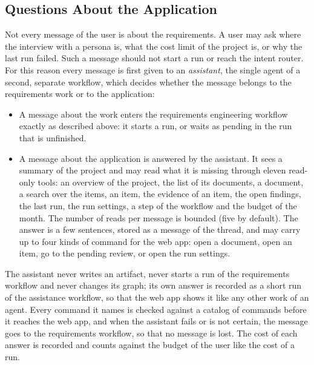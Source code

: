 \subsection{Questions About the Application}
\label{sec:pa-assistance}
Not every message of the user is about the requirements. A user may ask where the interview with a persona is, what the cost limit of the project is, or why the last run failed. Such a message should not start a run or reach the intent router. For this reason every message is first given to an \emph{assistant}, the single agent of a second, separate workflow, which decides whether the message belongs to the requirements work or to the application:
\begin{itemize}
    \item A message about the work enters the requirements engineering workflow exactly as described above: it starts a run, or waits as pending in the run that is unfinished.
    \item A message about the application is answered by the assistant. It sees a summary of the project and may read what it is missing through eleven read-only tools: an overview of the project, the list of its documents, a document, a search over the items, an item, the evidence of an item, the open findings, the last run, the run settings, a step of the workflow and the budget of the month. The number of reads per message is bounded (five by default). The answer is a few sentences, stored as a message of the thread, and may carry up to four kinds of command for the web app: open a document, open an item, go to the pending review, or open the run settings.
\end{itemize}
The assistant never writes an artifact, never starts a run of the requirements workflow and never changes its graph; its own answer is recorded as a short run of the assistance workflow, so that the web app shows it like any other work of an agent. Every command it names is checked against a catalog of commands before it reaches the web app, and when the assistant fails or is not certain, the message goes to the requirements workflow, so that no message is lost. The cost of each answer is recorded and counts against the budget of the user like the cost of a run.
